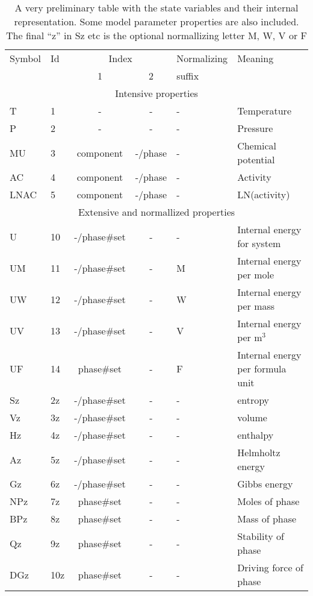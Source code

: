 \documentclass[12pt]{article}
\begin{document}
\begin{table}[!h]
\caption{A very preliminary table with the state variables and their
  internal representation.  Some model parameter properties are also
  included.  The final ``z'' in Sz etc is the optional normallizing
  letter M, W, V or F}\label{tab:statevar}
\begin{tabular}{|llccll|}\hline
Symbol & Id & \multicolumn{2}{c}{Index} & Normalizing & Meaning\\
       &    & 1 & 2                     &  suffix     & \\\hline
\multicolumn{6}{|c|}{Intensive properties}\\\hline
T      & 1  & -         & -    & - & Temperature\\
P      & 2  & -         & -    & - & Pressure\\
MU     & 3  & component & -/phase  & - & Chemical potential\\
AC     & 4  & component & -/phase  & - & Activity\\
LNAC   & 5  & component & -/phase  & - & LN(activity)\\\hline
\multicolumn{6}{|c|}{Extensive and normallized properties}\\\hline
U      & 10 & -/phase\#set & - & - & Internal energy for system\\
UM     & 11 & -/phase\#set & - & M & Internal energy per mole\\
UW     & 12 & -/phase\#set & - & W & Internal energy per mass\\
UV     & 13 & -/phase\#set & - & V & Internal energy per m$^3$\\
UF     & 14 & phase\#set   & - & F & Internal energy per formula unit\\
Sz     & 2z & -/phase\#set & - & - & entropy\\
Vz     & 3z & -/phase\#set & - & - & volume\\
Hz     & 4z & -/phase\#set & - & - & enthalpy\\
Az     & 5z & -/phase\#set & - & - & Helmholtz energy\\
Gz     & 6z & -/phase\#set & - & - & Gibbs energy\\
NPz    & 7z &  phase\#set & - & - & Moles of phase\\
BPz    & 8z & phase\#set & - & - & Mass of phase\\
Qz     & 9z & phase\#set & - & -  & Stability of phase\\
DGz    & 10z & phase\#set & - & -  & Driving force of phase\\

\end{tabular}
\end{table}
\end{document}
